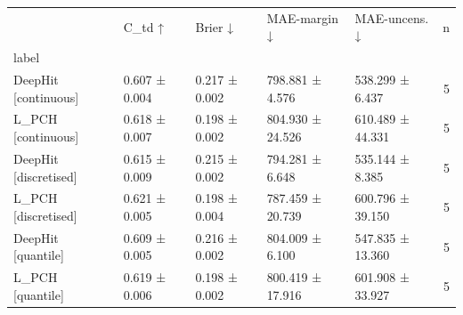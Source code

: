 \begin{tabular}{lllllr}
\toprule
 & C\_td ↑ & Brier ↓ & MAE-margin ↓ & MAE-uncens. ↓ & n \\
label &  &  &  &  &  \\
\midrule
DeepHit [continuous] & 0.607 ± 0.004 & 0.217 ± 0.002 & 798.881 ± 4.576 & 538.299 ± 6.437 & 5 \\
L\_PCH [continuous] & 0.618 ± 0.007 & 0.198 ± 0.002 & 804.930 ± 24.526 & 610.489 ± 44.331 & 5 \\
DeepHit [discretised] & 0.615 ± 0.009 & 0.215 ± 0.002 & 794.281 ± 6.648 & 535.144 ± 8.385 & 5 \\
L\_PCH [discretised] & 0.621 ± 0.005 & 0.198 ± 0.004 & 787.459 ± 20.739 & 600.796 ± 39.150 & 5 \\
DeepHit [quantile] & 0.609 ± 0.005 & 0.216 ± 0.002 & 804.009 ± 6.100 & 547.835 ± 13.360 & 5 \\
L\_PCH [quantile] & 0.619 ± 0.006 & 0.198 ± 0.002 & 800.419 ± 17.916 & 601.908 ± 33.927 & 5 \\
\bottomrule
\end{tabular}
